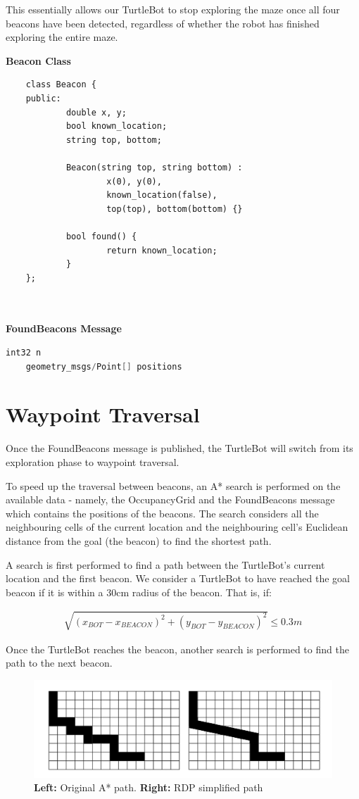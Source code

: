\documentclass[titlepage,12pt,a4paper]{article}
\begin{document}
This essentially allows our TurtleBot to stop exploring the maze once all four beacons have been detected, regardless of whether the robot has finished exploring the entire maze.

\textbf{Beacon Class}
\begin{lstlisting}
	class Beacon {
	public:
    		double x, y;
    		bool known_location;
    		string top, bottom;

    		Beacon(string top, string bottom) :
        			x(0), y(0),
        			known_location(false),
        			top(top), bottom(bottom) {}

    		bool found() {
        			return known_location;
    		}
	};
	
\end{lstlisting}

\textbf{\\FoundBeacons Message}
\begin{lstlisting}[language=C++]
	int32 n
	geometry_msgs/Point[] positions
\end{lstlisting}

\pagebreak
\section{Waypoint Traversal}

Once the FoundBeacons message is published, the TurtleBot will switch from its exploration phase to waypoint traversal.

To speed up the traversal between beacons, an A* search is performed on the available data - namely, the OccupancyGrid and the FoundBeacons message which contains the positions of the beacons. The search considers all the neighbouring cells of the current location and the neighbouring cell's Euclidean distance from the goal (the beacon) to find the shortest path. 

A search is first performed to find a path between the TurtleBot's current location and the first beacon. We consider a TurtleBot to have reached the goal beacon if it is within a 30cm radius of the beacon. That is, if: 

\begin{align*}
	\sqrt{(x_{BOT} - x_{BEACON})^2 + (y_{BOT} - y_{BEACON})^2} \leq 0.3m 
\end{align*}

Once the TurtleBot reaches the beacon, another search is performed to find the path to the next beacon.

\begin{figure}[h]
  	\begin{center}
	\includegraphics[scale=0.27]{rdpExample.jpg}
	\caption{\textbf{Left:} Original A* path. \textbf{Right:} RDP simplified path}
	\end{center}
\end{figure}
\end{document}

